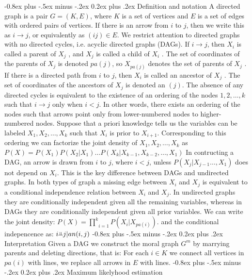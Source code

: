 \documentclass[9pt,landscape]{extarticle}
\makeatletter
\newcommand{\indep}{\rotatebox[origin=c]{90}{$\vDash$}}
\renewcommand{\subsection}{\@startsection{subsection}{2}{0mm}%
                                {-0.8ex plus -.5ex minus -.2ex}%
                                {0.2ex plus .2ex}%
                                {\normalfont\normalsize\bfseries}}
\makeatother
\begin{document}
\begin{multicols}{3}
\subsection{Definition and notation}
A directed graph is a pair $G = (K, E)$, where $K$ is a set of vertices and $E$
is a set of edges with ordered pairs of vertices.
If there is an arrow from $i$ to $j$,
then we write this as $i \to j$, or equivalently as $(ij) \in E$.
We restrict attention to directed graphs with no directed cycles,
i.e. acyclic directed graphs (DAGs). If $i \to j$,
then $X_i$ is called a parent of $X_j$ ,
and $X_j$ is called a child of $X_i$ .
The set of coordinates of the parents of $X_j$ is denoted $pa(j)$, so
$X_{pa(j)}$ denotes the set of parents of $X_j$ .
If there is a directed path from $i$ to $j$,
then $X_i$ is called an ancestor of $X_j$ .
The set of coordinates of the ancestors of $X_j$ is denoted an $(j)$.
The absence of any directed cycles is equivalent to the existence of an
ordering of the nodes ${1, 2, \dots , k}$ such that $i \to j$ only when $i < j$.
In other words, there exists an ordering of the nodes such that arrows point
only from lower-numbered nodes to higher-numbered nodes.
Suppose that a priori knowledge tells us the variables can be labeled
$X_1 , X_2 , \dots , X_k$ such that $X_i$ is prior to $X_{i+1}$.
Corresponding to this ordering we can factorize the joint density of
$X_1 , X_2 , \dots , X_k$ as $P(X)=P(X_1)P(X_2|X_1)\dots P(X_k|X_{k-1},X_{k-2},\dots,X_1)$
In contructing a DAG, an arrow is drawn from $i$ to $j$, where $i<j$, unless
$P(X_j|X_{j-1}\dots,X_1)$ does not depend on $X_i$.
This is the key difference between DAGs and undirected graphs.
In both types of graph a missing edge between $X_i$ and $X_j$ is equivalent to
a conditional independence relation between $X_i$ and $X_j$.
In undirected graphs they are conditionally independent given all the remaining
variables, whereas in DAGs they are conditionally independent given all prior
variables. 
We can write the joint density:
$P(X)=\underset{i=1}{\overset{k}{\prod}}P(X_i|X_{pa(i)})$.
and the conditional indepencence as: $i \indep j|an({i,j})$
\subsection{Interpretation}
Given a DAG we construct the moral graph $G^m$ by marrying parents and deleting
directions, that is:
For each $i \in K$ we connect all vertices in $pa(i)$ with lines, we replace all
arrows in $E$ with lines.
\subsection{Maximum likelyhood estimation}

\end{multicols}
\end{document}
